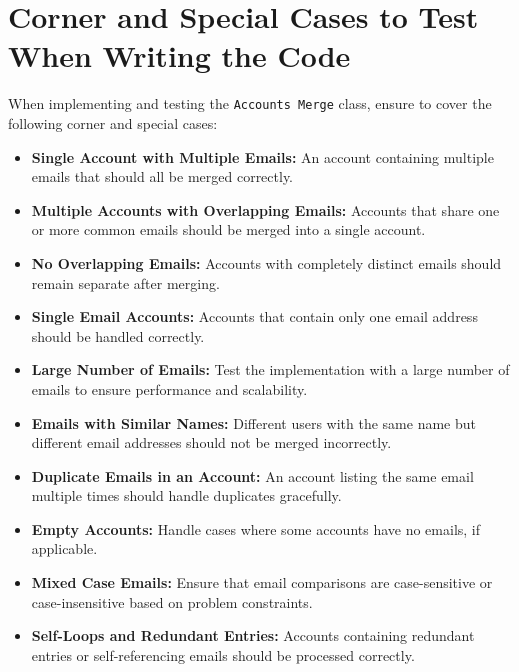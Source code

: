 \section*{Corner and Special Cases to Test When Writing the Code}

When implementing and testing the \texttt{Accounts Merge} class, ensure to cover the following corner and special cases:

\begin{itemize}
    \item \textbf{Single Account with Multiple Emails:}  
    An account containing multiple emails that should all be merged correctly.
    
    \item \textbf{Multiple Accounts with Overlapping Emails:} 
    Accounts that share one or more common emails should be merged into a single account.
    
    \item \textbf{No Overlapping Emails:} 
    Accounts with completely distinct emails should remain separate after merging.
    
    \item \textbf{Single Email Accounts:} 
    Accounts that contain only one email address should be handled correctly.
    
    \item \textbf{Large Number of Emails:} 
    Test the implementation with a large number of emails to ensure performance and scalability.
    
    \item \textbf{Emails with Similar Names:} 
    Different users with the same name but different email addresses should not be merged incorrectly.
    
    \item \textbf{Duplicate Emails in an Account:} 
    An account listing the same email multiple times should handle duplicates gracefully.
    
    \item \textbf{Empty Accounts:} 
    Handle cases where some accounts have no emails, if applicable.
    
    \item \textbf{Mixed Case Emails:} 
    Ensure that email comparisons are case-sensitive or case-insensitive based on problem constraints.
    
    \item \textbf{Self-Loops and Redundant Entries:} 
    Accounts containing redundant entries or self-referencing emails should be processed correctly.
\end{itemize}

